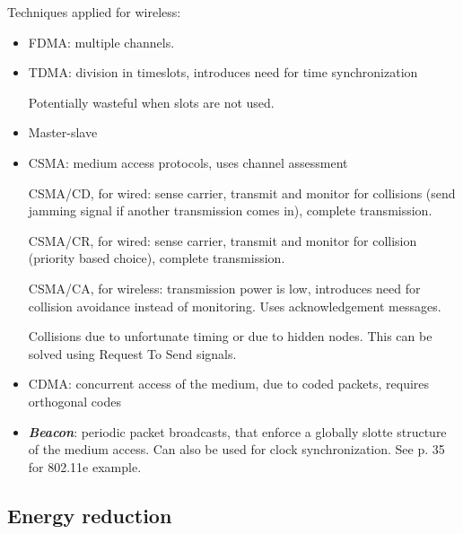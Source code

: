\documentclass[11pt]{article}
\let\oldemph\emph
\renewcommand{\emph}[1]{\oldemph{\textbf{#1}}\marginpar{\textbf{#1}}}
\begin{document}
    Techniques applied for wireless:
    \begin{itemize}
        \item FDMA: multiple channels.
        \item TDMA: division in timeslots, introduces need for time synchronization

        Potentially wasteful when slots are not used.

        \item Master-slave
        \item CSMA: medium access protocols, uses channel assessment

        CSMA/CD, for wired: sense carrier, transmit and monitor for collisions (send jamming signal if another transmission comes in), complete transmission.

        CSMA/CR, for wired: sense carrier, transmit and monitor for collision (priority based choice), complete transmission.

        CSMA/CA, for wireless: transmission power is low, introduces need for collision avoidance instead of monitoring.
        Uses acknowledgement messages.

        Collisions due to unfortunate timing or due to hidden nodes.
        This can be solved using Request To Send signals.

        \item CDMA: concurrent access of the medium, due to coded packets, requires orthogonal codes

        \item \emph{Beacon}: periodic packet broadcasts, that enforce a globally slotte structure of the medium access.
        Can also be used for clock synchronization.
        See p. 35 for 802.11e example.
    \end{itemize}

    \subsection{Energy reduction}
\end{document}
